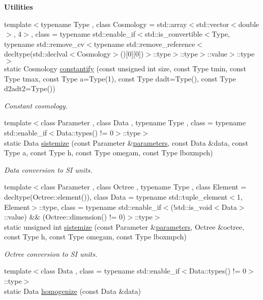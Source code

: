 \begin{Indent}{\bf Utilities}
\begin{DoxyCompactItemize}
{\footnotesize template$<$typename Type , class Cosmology  = std\-::array$<$std\-::vector$<$double$>$, 4$>$, class  = typename std\-::enable\-\_\-if$<$std\-::is\-\_\-convertible$<$\-Type, typename std\-::remove\-\_\-cv$<$typename std\-::remove\-\_\-reference$<$decltype(std\-::declval$<$\-Cosmology$>$()\mbox{[}0\mbox{]}\mbox{[}0\mbox{]})$>$\-::type$>$\-::type$>$\-::value$>$\-::type$>$ }\\static Cosmology \hyperlink{exceptionInput_ad86e769634c817f09bcdde8c3958e54d}{constantify} (const unsigned int size, const Type tmin, const Type tmax, const Type a=Type(1), const Type dadt=Type(), const Type d2adt2=Type())
\begin{DoxyCompactList}\small\item\em Constant cosmology. \end{DoxyCompactList}\item 
{\footnotesize template$<$class Parameter , class Data , typename Type , class  = typename std\-::enable\-\_\-if$<$\-Data\-::types() != 0$>$\-::type$>$ }\\static Data \hyperlink{exceptionInput_abdcd382d232673326e4f759ffe67c58c}{sistemize} (const Parameter \&\hyperlink{rays_8h_ae1bc8b0b8c8b9f8e4cc61a5cc7c4ce9e}{parameters}, const Data \&data, const Type a, const Type h, const Type omegam, const Type lboxmpch)
\begin{DoxyCompactList}\small\item\em Data conversion to S\-I units. \end{DoxyCompactList}\item 
{\footnotesize template$<$class Parameter , class Octree , typename Type , class Element  = decltype(\-Octree\-::element()), class Data  = typename std\-::tuple\-\_\-element$<$1, Element$>$\-::type, class  = typename std\-::enable\-\_\-if$<$(!std\-::is\-\_\-void$<$\-Data$>$\-::value) \&\& (\-Octree\-::dimension() != 0)$>$\-::type$>$ }\\static unsigned int \hyperlink{exceptionInput_ad51758a7519270c34e5cc7a2c3e254cb}{sistemize} (const Parameter \&\hyperlink{rays_8h_ae1bc8b0b8c8b9f8e4cc61a5cc7c4ce9e}{parameters}, Octree \&octree, const Type h, const Type omegam, const Type lboxmpch)
\begin{DoxyCompactList}\small\item\em Octree conversion to S\-I units. \end{DoxyCompactList}\item 
{\footnotesize template$<$class Data , class  = typename std\-::enable\-\_\-if$<$\-Data\-::types() != 0$>$\-::type$>$ }\\static Data \hyperlink{exceptionInput_ad43fe70367197a64504b4fe2dae861a3}{homogenize} (const Data \&data)

\end{DoxyCompactItemize}
\end{Indent}
